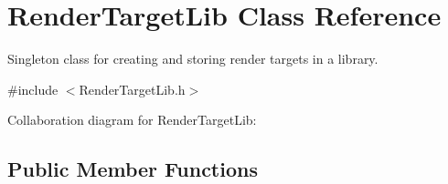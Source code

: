 \hypertarget{class_render_target_lib}{\section{Render\-Target\-Lib Class Reference}
\label{class_render_target_lib}
}


Singleton class for creating and storing render targets in a library.  




{\ttfamily \#include $<$Render\-Target\-Lib.\-h$>$}



Collaboration diagram for Render\-Target\-Lib\-:
\subsection*{Public Member Functions}
